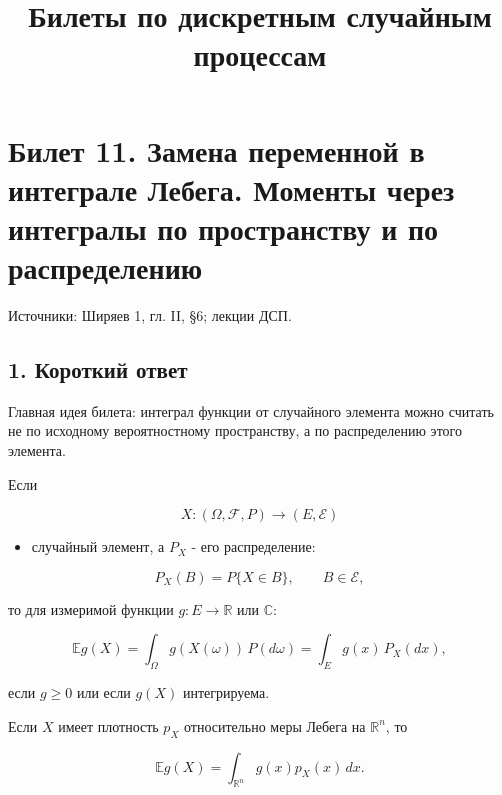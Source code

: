 \documentclass[
  11pt,
  a4paper,
]{article}
\title{Билеты по дискретным случайным процессам}
\author{}
\date{}
\providecommand{\tightlist}{%
  \setlength{\itemsep}{0pt}\setlength{\parskip}{0pt}}
\begin{document}
\maketitle

\section{Билет 11. Замена переменной в интеграле Лебега. Моменты через
интегралы по пространству и по
распределению}\label{ux431ux438ux43bux435ux442-11.-ux437ux430ux43cux435ux43dux430-ux43fux435ux440ux435ux43cux435ux43dux43dux43eux439-ux432-ux438ux43dux442ux435ux433ux440ux430ux43bux435-ux43bux435ux431ux435ux433ux430.-ux43cux43eux43cux435ux43dux442ux44b-ux447ux435ux440ux435ux437-ux438ux43dux442ux435ux433ux440ux430ux43bux44b-ux43fux43e-ux43fux440ux43eux441ux442ux440ux430ux43dux441ux442ux432ux443-ux438-ux43fux43e-ux440ux430ux441ux43fux440ux435ux434ux435ux43bux435ux43dux438ux44e}

Источники: Ширяев 1, гл. II, §6; лекции ДСП.

\subsection{1. Короткий
ответ}\label{ux43aux43eux440ux43eux442ux43aux438ux439-ux43eux442ux432ux435ux442}

Главная идея билета: интеграл функции от случайного элемента можно
считать не по исходному вероятностному пространству, а по распределению
этого элемента.

Если

\[
X:(\Omega,\mathcal F,P)\to(E,\mathcal E)
\]

\begin{itemize}
\tightlist
\item
  случайный элемент, а \(P_X\) - его распределение:
\end{itemize}

\[
P_X(B)=P\{X\in B\},
\qquad B\in\mathcal E,
\]

то для измеримой функции \(g:E\to\mathbb R\) или \(\mathbb C\):

\[
\mathbb E g(X)
=
\int_\Omega g(X(\omega))\,P(d\omega)
=
\int_E g(x)\,P_X(dx),
\]

если \(g\ge0\) или если \(g(X)\) интегрируема.

Если \(X\) имеет плотность \(p_X\) относительно меры Лебега на
\(\mathbb R^n\), то

\[
\mathbb E g(X)=\int_{\mathbb R^n} g(x)p_X(x)\,dx.
\]
\end{document}

